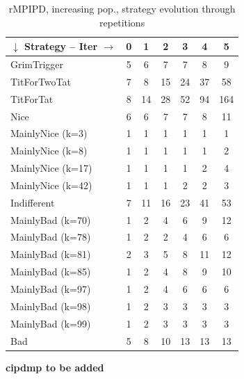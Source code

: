 \documentclass[journal,a4paper,10pt,twoside]{IEEEtran} %
\begin{document}
\begin{table}[ht]
	\caption{rMPIPD, increasing pop., strategy evolution through repetitions}
	\label{tab:ripdmp-incr}
	\centering
	\begin{tabular}{l|cccccc} \toprule
		$\downarrow$ Strategy -- Iter $\rightarrow$ & 0 &  1 &  2 &  3 &  4 &   5 \\ \midrule
		GrimTrigger       & 5 &  6 &  7 &  7 &  8 &   9 \\
		TitForTwoTat      & 7 &  8 & 15 & 24 & 37 &  58 \\
		TitForTat         & 8 & 14 & 28 & 52 & 94 & 164 \\
		Nice              & 6 &  6 &  7 &  7 &  8 &  11 \\
		MainlyNice (k=3)  & 1 &  1 &  1 &  1 &  1 &   1 \\
		MainlyNice (k=8)  & 1 &  1 &  1 &  1 &  1 &   2 \\
		MainlyNice (k=17) & 1 &  1 &  1 &  1 &  2 &   4 \\
		MainlyNice (k=42) & 1 &  1 &  1 &  2 &  2 &   3 \\
		Indifferent       & 7 & 11 & 16 & 23 & 41 &  53 \\
		MainlyBad (k=70)  & 1 &  2 &  4 &  6 &  9 &  12 \\
		MainlyBad (k=78)  & 1 &  2 &  2 &  4 &  6 &   6 \\
		MainlyBad (k=81)  & 2 &  3 &  5 &  8 & 11 &  12 \\
		MainlyBad (k=85)  & 1 &  2 &  4 &  8 &  9 &  10 \\
		MainlyBad (k=97)  & 1 &  2 &  4 &  6 &  6 &   6 \\
		MainlyBad (k=98)  & 1 &  2 &  3 &  3 &  3 &   3 \\
		MainlyBad (k=99)  & 1 &  2 &  3 &  3 &  3 &   3 \\
		Bad               & 5 &  8 & 10 & 13 & 13 &  13 \\ \bottomrule
	\end{tabular}
\end{table}

\textbf{cipdmp to be added}
\end{document}

